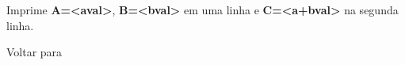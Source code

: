\documentclass[letterpaper,10pt,brazil]{sphinxmanual}
\begin{document}
\begin{DUlineblock}{0em}
\item[] 
\item[]
\begin{DUlineblock}{\DUlineblockindent}
\item[] 
\item[] 
\end{DUlineblock}
\item[] Imprime \textbf{A=\textless{}aval\textgreater{}}, \textbf{B=\textless{}bval\textgreater{}} em uma linha e \textbf{C=\textless{}a+bval\textgreater{}} na segunda linha.
\item[] 
\item[] Voltar para {\hyperref[debugger/general:debugger\string-general\string-list]{}}
\end{DUlineblock}
\begin{quote}
\label{debugger/general:debugger-command-logerror}\end{quote}
\end{document}
